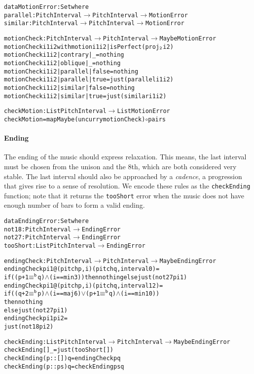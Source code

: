 \begin{alltt}
data MotionError : Set where
  parallel : PitchInterval \(\rightarrow\) PitchInterval \(\rightarrow\) MotionError
  similar  : PitchInterval \(\rightarrow\) PitchInterval \(\rightarrow\) MotionError

motionCheck : PitchInterval \(\rightarrow\) PitchInterval \(\rightarrow\) Maybe MotionError
motionCheck i1 i2 with motion i1 i2 | isPerfect (proj\(\sb{\mathtt{2}}\) i2)
motionCheck i1 i2 | contrary | \_     = nothing
motionCheck i1 i2 | oblique  | \_     = nothing
motionCheck i1 i2 | parallel | false = nothing
motionCheck i1 i2 | parallel | true  = just (parallel i1 i2)
motionCheck i1 i2 | similar  | false = nothing
motionCheck i1 i2 | similar  | true  = just (similar i1 i2)

checkMotion : List PitchInterval \(\rightarrow\) List MotionError
checkMotion = mapMaybe (uncurry motionCheck) \(\circ\) pairs  
\end{alltt}

\paragraph{Ending}
The ending of the music should express relaxation.
This means, the last interval must be chosen from the unison and
the 8th, which are both considered very stable.
The last interval should also be approached by a \emph{cadence},
a progression that gives rise to a sense of resolution.
We encode these rules as the \texttt{checkEnding} function;
note that it returns the \texttt{tooShort} error when the music does
not have enough number of bars to form a valid ending.

\begin{alltt}
data EndingError : Set where
  not18    : PitchInterval \(\rightarrow\) EndingError
  not27    : PitchInterval \(\rightarrow\) EndingError
  tooShort : List PitchInterval \(\rightarrow\) EndingError

endingCheck : PitchInterval \(\rightarrow\) PitchInterval \(\rightarrow\) Maybe EndingError
endingCheck pi1@(pitch p , i) (pitch q , interval 0)  = 
  if ((p + 1 \(\equiv\sp{\mathtt{b}}\) q) \(\wedge\) (i == min3)) then nothing else just (not27 pi1)
endingCheck pi1@(pitch p , i) (pitch q , interval 12) =
  if ((q + 2 \(\equiv\sp{\mathtt{b}}\) p) \(\wedge\) (i == maj6) \(\vee\) (p + 1 \(\equiv\sp{\mathtt{b}}\) q) \(\wedge\) (i == min10))
  then nothing
  else just (not27 pi1)
endingCheck pi1               pi2                     =
  just (not18 pi2)

checkEnding : List PitchInterval \(\rightarrow\) PitchInterval \(\rightarrow\) Maybe EndingError
checkEnding []        \_ = just (tooShort [])
checkEnding (p :: []) q = endingCheck p q
checkEnding (p :: ps) q = checkEnding ps q
\end{alltt}

